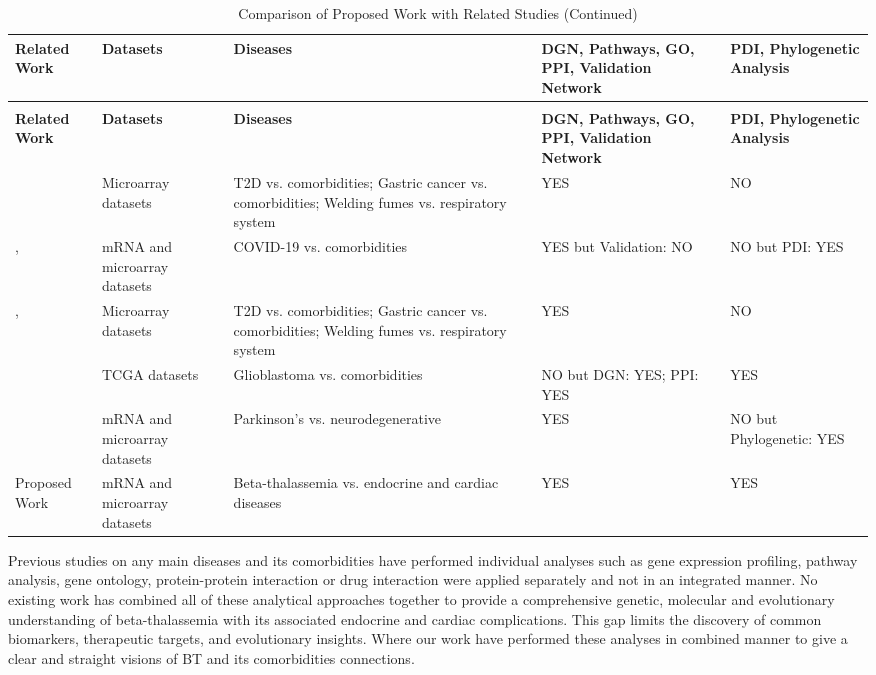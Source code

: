 \vspace{5mm} %
\begin{longtable}{|p{1.3cm}|p{2.9cm}|p{3.9cm}|p{2.8cm}|p{2cm}|}
\caption{Comparison of Proposed Work with Related Studies} \label{tab:2.2} \\
\hline
\textbf{Related Work} & \textbf{Datasets} & \textbf{Diseases} & \textbf{DGN, Pathways, GO, PPI, Validation Network} & \textbf{PDI, Phylogenetic Analysis} \\
\hline
\endfirsthead
\caption[]{Comparison of Proposed Work with Related Studies (Continued)} \\
\hline
\textbf{Related Work} & \textbf{Datasets} & \textbf{Diseases} & \textbf{DGN, Pathways, GO, PPI, Validation Network} & \textbf{PDI, Phylogenetic Analysis} \\
\hline
\endhead
\hline
\endfoot
\cite{b3} & Microarray datasets & T2D vs. comorbidities; Gastric cancer vs. comorbidities; Welding fumes vs. respiratory system & YES & NO \\
\hline
\cite{b10}, \cite{b14} & mRNA and microarray datasets & COVID-19 vs. comorbidities & YES but Validation: NO & NO but PDI: YES \\
\hline
\cite{b15}, \cite{b22} & Microarray datasets & T2D vs. comorbidities; Gastric cancer vs. comorbidities; Welding fumes vs. respiratory system & YES & NO \\
\hline
\cite{b18} & TCGA datasets & Glioblastoma vs. comorbidities & NO but DGN: YES; PPI: YES & YES \\
\hline
\cite{b24} & mRNA and microarray datasets & Parkinson's vs. neurodegenerative & YES & NO but Phylogenetic: YES \\
\hline
Proposed Work & mRNA and microarray datasets & Beta-thalassemia vs. endocrine and cardiac diseases & YES & YES \\
\hline
\end{longtable}

Previous studies on any main diseases and its comorbidities have performed individual analyses such as gene expression profiling, pathway analysis, gene ontology, protein-protein interaction or drug interaction were applied separately and not in an integrated manner. No existing work has combined all of these analytical approaches together to provide a comprehensive genetic, molecular and evolutionary understanding of beta-thalassemia with its associated endocrine and cardiac complications. This gap limits the discovery of common biomarkers, therapeutic targets, and evolutionary insights. Where our work have performed these analyses in combined manner to give a clear and straight visions of BT and its comorbidities connections.


